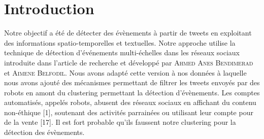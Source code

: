 \documentclass[12pt]{article}
\begin{document}
\begin{abstract}
La d\'etection d'\'ev\`enements est un des sujets de recherche les plus importants dans l'analyse des r\'eseaux sociaux.
Les flux de donn\'ees provenant des plates-formes de ces r\'eseaux contiennent, la plupart du temps, beaucoup d'informations. On peut traiter et analyser ces informations dans le but de faire de la d\'etection d'\'ev\`enement(s). 
\newline
N\'eanmoins, une grande partie des donn\'ees \`a traiter est bruit\'ee, notamment par des comptes Twitter entretenus par des robots. Ces comptes postent des tweets en masse avec une fr\'equence de publication constante, ce qui nous emp\^echent de donner une bonne description d\' un \'ev\'enement ou alors on peut cr\'eer de faux \'ev\`enements. 
\newline
Voila pourquoi il est important de comprendre comment att\'enuer l'influence du bruit pour faire de la d\'etection \'ev\`enements. Notre objectif a \'et\'e de d\'etecter des \'ev\`enements \`a partir de tweets en exploitant des informations spatio-temporelles et textuelles en essayant d'\'ecarter les tweets de robots. 
\end{abstract}

\small{
\tableofcontents 
}

\newpage

\section{Introduction}

Notre objectif a \'et\'e de d\'etecter des \'ev\`enements \`a partir de tweets en exploitant des informations spatio-temporelles et textuelles. Notre approche utilise la technique de d\'etection d'\'ev\'enements multi-\'echelles dans les r\'eseaux sociaux introduite dans l'article de recherche \cite{Multievents} et d\'evelopp\'e par \textsc{Ahmed Anes Bendimerad} et \textsc{Aimene Belfodil}. Nous avons adapt\'e cette version \`a nos donn\'ees \`a laquelle nous avons ajout\'e des m\'ecanismes permettant de filtrer les tweets envoy\'es par des robots en amont du clustering permettant la d\'etection d'\'ev\`enements. Les comptes automatisés, appel\'es robots, abusent des r\'eseaux sociaux en affichant du contenu non-\'ethique [1], soutenant des activit\'es parrain\'ees ou utilisant leur compte pour de la vente [17]. Il est fort probable qu'ils faussent notre clustering pour la d\'etection des \'ev\`enements.
\end{document}
